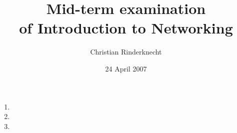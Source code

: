 \documentclass[11pt,a4paper]{article}
\title{Mid-term examination\\ of Introduction to Networking}
\author{Christian Rinderknecht}
\date{24 April 2007}
\begin{document}
\maketitle

\thispagestyle{empty}

\begin{enumerate}

  \item
    
    

  \item
    
    

  \item
    
    

\end{enumerate}
\end{document}
